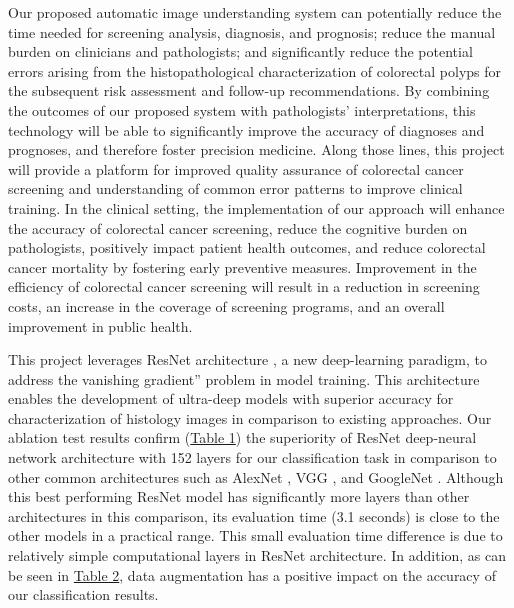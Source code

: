 \documentclass[review]{elsarticle}
\begin{document}
Our proposed automatic image understanding system can potentially reduce the time needed for screening analysis, diagnosis, and prognosis; reduce the manual burden on clinicians and pathologists; and significantly reduce the potential errors arising from the histopathological characterization of colorectal polyps for the subsequent risk assessment and follow-up recommendations. By combining the outcomes of our proposed system with pathologists' interpretations, this technology will be able to significantly improve the accuracy of diagnoses and prognoses, and therefore foster precision medicine. Along those lines, this project will provide a platform for improved quality assurance of colorectal cancer screening and understanding of common error patterns to improve clinical training. In the clinical setting, the implementation of our approach will enhance the accuracy of colorectal cancer screening, reduce the cognitive burden on pathologists, positively impact patient health outcomes, and reduce colorectal cancer mortality by fostering early preventive measures. Improvement in the efficiency of colorectal cancer screening will result in a reduction in screening costs, an increase in the coverage of screening programs, and an overall improvement in public health.

This project leverages ResNet architecture \citep{he2015deep}, a new deep-learning paradigm, to address the vanishing gradient” problem in model training. This architecture enables the development of ultra-deep models with superior accuracy for characterization of histology images in comparison to existing approaches. Our ablation test results confirm (\hyperref[table:ablation]{Table 1}) the superiority of ResNet deep-neural network architecture with 152 layers for our classification task in comparison to other common architectures such as AlexNet \citep{krizhevsky2012imagenet}, VGG \citep{simonyan2013deep}, and GoogleNet \citep{szegedy2015going}. Although this best performing ResNet model has significantly more layers than other architectures in this comparison, its evaluation time (3.1 seconds) is close to the other models in a practical range. This small evaluation time difference is due to relatively simple computational layers in ResNet architecture. In addition, as can be seen in  \hyperref[table:byclass_crops]{Table 2}, data augmentation has a positive impact on the accuracy of our classification results.
\end{document}

